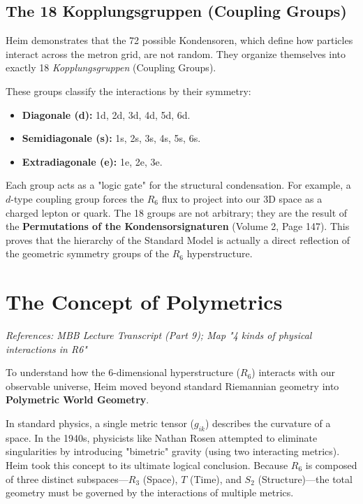 \documentclass[11pt,a4paper,oneside]{article}
\begin{document}
\subsection{The 18 Kopplungsgruppen (Coupling Groups)}
Heim demonstrates that the 72 possible Kondensoren, which define how particles interact across the metron grid, are not random. They organize themselves into exactly 18 \textit{Kopplungsgruppen} (Coupling Groups). 

These groups classify the interactions by their symmetry:
\begin{itemize}
    \item \textbf{Diagonale (d):} 1d, 2d, 3d, 4d, 5d, 6d.
    \item \textbf{Semidiagonale (s):} 1s, 2s, 3s, 4s, 5s, 6s.
    \item \textbf{Extradiagonale (e):} 1e, 2e, 3e.
\end{itemize}

Each group acts as a "logic gate" for the structural condensation. For example, a $d$-type coupling group forces the $R_6$ flux to project into our 3D space as a charged lepton or quark. The 18 groups are not arbitrary; they are the result of the \textbf{Permutations of the Kondensorsignaturen} (Volume 2, Page 147). This proves that the hierarchy of the Standard Model is actually a direct reflection of the geometric symmetry groups of the $R_6$ hyperstructure.

\section{The Concept of Polymetrics}
\label{sec:polymetrics}

\textit{References: MBB Lecture Transcript (Part 9); Map "4 kinds of physical interactions in R6"}

To understand how the 6-dimensional hyperstructure ($R_6$) interacts with our observable universe, Heim moved beyond standard Riemannian geometry into \textbf{Polymetric World Geometry}. 

In standard physics, a single metric tensor ($g_{ik}$) describes the curvature of a space. In the 1940s, physicists like Nathan Rosen attempted to eliminate singularities by introducing "bimetric" gravity (using two interacting metrics). Heim took this concept to its ultimate logical conclusion. Because $R_6$ is composed of three distinct subspaces—$R_3$ (Space), $T$ (Time), and $S_2$ (Structure)—the total geometry must be governed by the interactions of multiple metrics.
\end{document}
